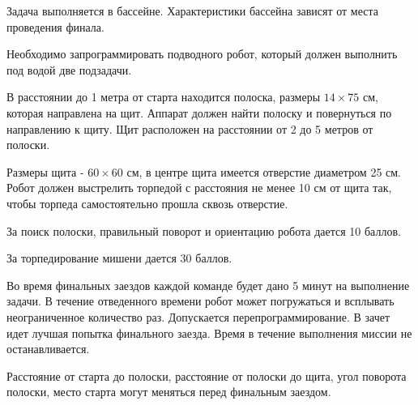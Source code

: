 
Задача выполняется в бассейне. Характеристики бассейна зависят от места проведения финала. 

Необходимо запрограммировать подводного робот, который должен выполнить под водой две подзадачи.

В расстоянии до 1 метра от старта находится полоска, размеры $14 \times 75$ см, которая направлена на щит. Аппарат должен найти полоску и повернуться по направлению к щиту. Щит расположен на расстоянии от 2 до 5 метров от полоски.

Размеры щита - $60 \times 60$ см, в центре щита имеется отверстие диаметром 25 см. Робот должен выстрелить торпедой с расстояния не менее 10 см от щита так, чтобы торпеда самостоятельно прошла сквозь отверстие.

За поиск полоски, правильный поворот и ориентацию робота дается 10 баллов.

За торпедирование мишени дается 30 баллов.

\markSection

Во время финальных заездов каждой команде будет дано 5 минут на выполнение задачи. В течение отведенного времени робот может погружаться и всплывать неограниченное количество раз. Допускается перепрограммирование. В зачет идет лучшая попытка финального заезда. Время в течение выполнения миссии не останавливается. 

Расстояние от старта до полоски, расстояние от полоски до щита, угол поворота полоски, место старта могут меняться перед финальным заездом. 